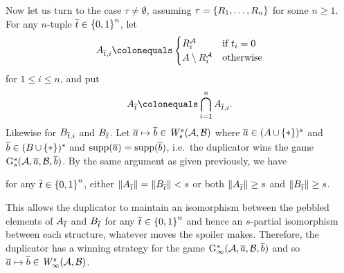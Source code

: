 \begin{enumerate}[1.]
Now let us turn to the case $\tau \neq \emptyset$, assuming $\tau = {\{R_1, \ldots, R_n\}}$ for some $n \geq 1$. For any $n$-tuple $\overline{t} \in {\{0, 1\}}^{n}$, let
\[
A_{\vect{t}, i} \defas \begin{cases}
\intpr{R_i}{\strct{A}} & \mbox{if \mathmode{t_i = 0}}\cr
A \setminus \intpr{R_i}{\strct{A}} & \mbox{otherwise}\cr
\end{cases}
\]
for $1 \leq i \leq n$, and put
\[
A_{\vect{t}} \defas \bintsc^n_{i = 1} A_{\vect{t}, i}.
\]
Likewise for $B_{\overline{t}, i}$ and $B_{\overline{t}}$. Let $\vect{a} \mapsto \vect{b} \in \winpos[s]{s}(\strct{A}, \strct{B})$ where $\overline{a} \in (A \mathop{\cup} {\{\ast\}})^{s}$ and $\overline{b} \in (B \mathop{\cup} {\{\ast\}})^{s}$ and $\mathrm{supp}(\overline{a}) = \mathrm{supp}(\overline{b})$, i.e.~the duplicator wins the game $\game[s]{s}(\strct{A}, \vect{a}, \strct{B}, \vect{b})$. By the same argument as given previously, we have
\begin{center}
for any $\overline{t} \in {\{0, 1\}}^{n}$, either $\|A_{\overline{t}}\| = \|B_{\overline{t}}\| < s$ or both $\|A_{\overline{t}}\| \geq s$ and $\|B_{\overline{t}}\| \geq s$.
\end{center}
This allows the duplicator to maintain an isomorphism between the pebbled elements of $A_{\overline{t}}$ and $B_{\overline{t}}$ for any $\overline{t} \in {\{0, 1\}}^{n}$ and hence an $s$-partial isomorphism between each structure, whatever moves the spoiler makes. Therefore, the duplicator has a winning strategy for the game $\game[s]{\infty}(\strct{A}, \vect{a}, \strct{B}, \vect{b})$ and so $\vect{a} \mapsto \vect{b} \in \winpos[s]{\infty}(\strct{A}, \strct{B})$.


\end{enumerate}
